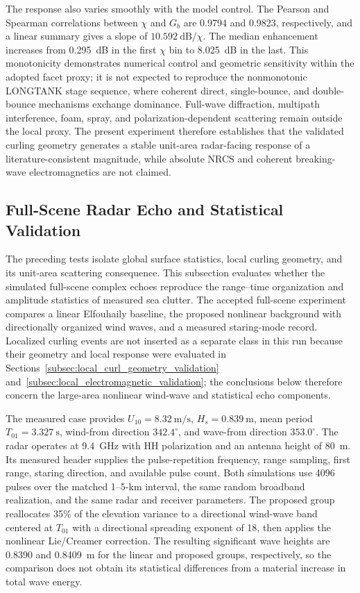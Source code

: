 The response also varies smoothly with the model control. The Pearson and Spearman correlations between $\chi$ and $G_b$ are 0.9794 and 0.9823, respectively, and a linear summary gives a slope of $10.592~\mathrm{dB}/\chi$. The median enhancement increases from 0.295~dB in the first $\chi$ bin to 8.025~dB in the last. This monotonicity demonstrates numerical control and geometric sensitivity within the adopted facet proxy; it is not expected to reproduce the nonmonotonic LONGTANK stage sequence, where coherent direct, single-bounce, and double-bounce mechanisms exchange dominance. Full-wave diffraction, multipath interference, foam, spray, and polarization-dependent scattering remain outside the local proxy. The present experiment therefore establishes that the validated curling geometry generates a stable unit-area radar-facing response of a literature-consistent magnitude, while absolute NRCS and coherent breaking-wave electromagnetics are not claimed.










\subsection{Full-Scene Radar Echo and Statistical Validation}
\label{subsec:full_scene_echo_validation}

The preceding tests isolate global surface statistics, local curling geometry, and its unit-area scattering consequence. This subsection evaluates whether the simulated full-scene complex echoes reproduce the range--time organization and amplitude statistics of measured sea clutter. The accepted full-scene experiment compares a linear Elfouhaily baseline, the proposed nonlinear background with directionally organized wind waves, and a measured staring-mode record. Localized curling events are not inserted as a separate class in this run because their geometry and local response were evaluated in Sections~\ref{subsec:local_curl_geometry_validation} and~\ref{subsec:local_electromagnetic_validation}; the conclusions below therefore concern the large-area nonlinear wind-wave and statistical echo components.

The measured case provides $U_{10}=8.32~\mathrm{m/s}$, $H_s=0.839~\mathrm{m}$, mean period $T_{01}=3.327~\mathrm{s}$, wind-from direction $342.4^{\circ}$, and wave-from direction $353.0^{\circ}$. The radar operates at 9.4~GHz with HH polarization and an antenna height of 80~m. Its measured header supplies the pulse-repetition frequency, range sampling, first range, staring direction, and available pulse count. Both simulations use 4096 pulses over the matched 1--5-km interval, the same random broadband realization, and the same radar and receiver parameters. The proposed group reallocates 35\% of the elevation variance to a directional wind-wave band centered at $T_{01}$ with a directional spreading exponent of 18, then applies the nonlinear Lie/Creamer correction. The resulting significant wave heights are 0.8390 and 0.8409~m for the linear and proposed groups, respectively, so the comparison does not obtain its statistical differences from a material increase in total wave energy.

